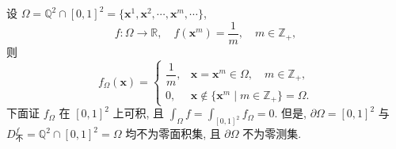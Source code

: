 \begin{example}\label{ex:10.2.1}
设 $\Omega = \mathbb{Q}^2 \cap [0, 1]^2 = \{\boldsymbol{x}^1, \boldsymbol{x}^2, \cdots, \boldsymbol{x}^m, \cdots\}$,
\[
f\colon\Omega\to\mathbb{R},\quad f(\boldsymbol{x}^m)=\frac{1}{m},\quad m\in\mathbb{Z}_+,
\]
则
\[
f_{\Omega}(\boldsymbol{x}) = \begin{cases}
\dfrac{1}{m}, & \boldsymbol{x}=\boldsymbol{x}^m\in\Omega,\quad m\in\mathbb{Z}_+, \\
0, & \boldsymbol{x}\notin\{\boldsymbol{x}^m\mid m\in\mathbb{Z}_+\}=\Omega.
\end{cases}
\]
下面证 $f_{\Omega}$ 在 $[0,1]^2$ 上可积, 且 $\int_{\Omega} f = \int_{[0,1]^2} f_{\Omega} = 0$. 但是, $\partial\Omega = [0,1]^2$ 与 $D_{\text{不}}^f = \mathbb{Q}^2 \cap [0,1]^2 = \Omega$ 均不为零面积集, 且 $\partial\Omega$ 不为零测集.


\end{example}
